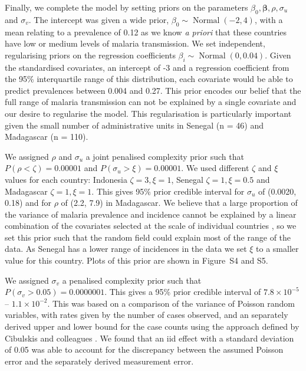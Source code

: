 \documentclass{statsoc}
\begin{document}
Finally, we complete the model by setting priors on the parameters $\beta_0, \boldsymbol\beta, \rho, \sigma_u$ and $\sigma_v$.
The intercept was given a wide prior, $\beta_0 \sim \operatorname{Normal}(-2, 4)$, with a mean relating to a prevalence of 0.12 as we know \emph{a priori} that these countries have low or medium levels of malaria transmission.
We set independent, regularising priors on the regression coefficients $\beta_i \sim \operatorname{Normal}(0, 0.04)$. 
Given the standardised covariates, an intercept of -3 and a regression coefficient from the 95\% interquartile range of this distribution, each covariate would be able to predict prevalences between 0.004 and 0.27. 
This prior encodes our belief that the full range of malaria transmission can not be explained by a single covariate and our desire to regularise the model.
This regularisation is particularly important given the small number of administrative units in Senegal (n = 46) and Madagascar (n = 110).

We assigned $\rho$ and $\sigma_u$ a joint penalised complexity prior \citep{fuglstad2018constructing} such that $P(\rho < \zeta) = 0.00001$ and $P(\sigma_u > \xi) = 0.00001$.
We used different $\zeta$  and $\xi$ values for each country: Indonesia $\zeta = 3, \xi = 1$, Senegal $\zeta = 1, \xi = 0.5$ and Madagascar $\zeta = 1, \xi = 1$.
This gives 95\% prior credible interval for $\sigma_u$ of (0.0020, 0.18) and for $\rho$ of (2.2, 7.9) in Madagascar.
We believe that a large proportion of the variance of malaria prevalence and incidence cannot be explained by a linear combination of the covariates selected at the scale of individual countries \citep{bhatt2017improved}, so we set this prior such that the random field could explain most of the range of the data.
As Senegal has a lower range of incidences in the data we set $\xi$ to a smaller value for this country.
Plots of this prior are shown in Figure~S4 and S5.

We assigned $\sigma_v$ a penalised complexity prior \citep{simpson2017penalising} such that $P(\sigma_v > 0.05) = 0.0000001$.
This gives a 95\% prior credible interval of $7.8\times 10^{-5}$ -- $1.1\times 10^{-2}$.
This was based on a comparison of the variance of Poisson random variables, with rates given by the number of cases observed, and an separately derived upper and lower bound for the case counts using the approach defined by Cibulskis and colleagues \citep{cibulskis2011worldwide}.
We found that an iid effect with a standard deviation of 0.05 was able to account for the discrepancy between the assumed Poisson error and the separately derived measurement error.
\end{document}
